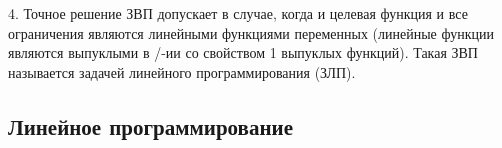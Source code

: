 4. Точное решение ЗВП допускает в случае, когда и целевая функция и все ограничения являются линейными функциями переменных (линейные функции являются выпуклыми в /-ии со свойством 1 выпуклых функций). Такая ЗВП называется задачей линейного программирования (ЗЛП).

\subsection{Линейное программирование}

